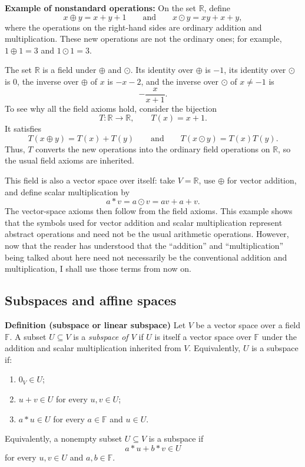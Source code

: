 \documentclass[a4paper,11pt,abstract=true]{scrartcl}
\theoremstyle{dotlessP}
\theoremstyle{dotlessS}
\theoremstyle{remark}
\theoremstyle{definition}
\begin{document}
\begin{example_box}
\textbf{Example of nonstandard operations:} On the set $\mathbb{R}$, define
\[
x\oplus y=x+y+1
\qquad\text{and}\qquad
x\odot y=xy+x+y,
\]
where the operations on the right-hand sides are ordinary addition and
multiplication. These new operations are not the ordinary ones; for example,
$1\oplus1=3$ and $1\odot1=3$.

The set $\mathbb{R}$ is a field under $\oplus$ and $\odot$. Its identity over $\oplus$ is $-1$, its  identity over $\odot$ is $0$, the inverse over $\oplus$ of
$x$ is $-x-2$, and the inverse over $\odot$ of $x\neq-1$ is
\[
-\frac{x}{x+1}.
\]
To see why all the field axioms hold, consider the bijection
\[
T:\mathbb{R}\longrightarrow\mathbb{R},\qquad T(x)=x+1.
\]
It satisfies
\[
T(x\oplus y)=T(x)+T(y)
\qquad\text{and}\qquad
T(x\odot y)=T(x)T(y).
\]
Thus, $T$ converts the new operations into the ordinary field operations on
$\mathbb{R}$, so the usual field axioms are inherited.

This field is also a vector space over itself: take $V=\mathbb{R}$, use
$\oplus$ for vector addition, and define scalar multiplication by
\[
a*v=a\odot v=av+a+v.
\]
The vector-space axioms then follow from the field axioms. This example shows
that the symbols used for vector addition and scalar multiplication represent
abstract operations and need not be the usual arithmetic operations. However, now that the reader has understood that the ``addition'' and ``multiplication'' being talked about here need not necessarily be the conventional addition and multiplication, I shall use those terms from now on.
\end{example_box}

\subsection{Subspaces and affine spaces}
\textbf{Definition (subspace or linear subspace)} Let $V$ be a vector space over a field $\mathbb{F}$.
A subset $U\subseteq V$ is a \emph{subspace of $V$} if $U$ is itself a vector
space over $\mathbb{F}$ under the addition and scalar multiplication inherited from
$V$. Equivalently, $U$ is a subspace if:
\begin{enumerate}
    \item $0_V\in U$;
    \item $u+v\in U$ for every $u,v\in U$;
    \item $a*u\in U$ for every $a\in \mathbb{F}$ and $u\in U$.
\end{enumerate}
Equivalently, a nonempty subset $U\subseteq V$ is a subspace if
\[
a*u+b*v\in U
\]
for every $u,v\in U$ and $a,b\in \mathbb{F}$.
\end{document}
